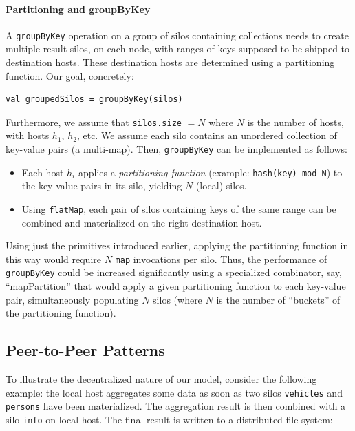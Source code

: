 \documentclass[preprint]{sigplanconf}
\theoremstyle{definition}
\theoremstyle{definition}
\begin{document}
\paragraph{Partitioning and groupByKey}

A \verb|groupByKey| operation on a group of silos containing collections needs
to create multiple result silos, on each node, with ranges of keys supposed to
be shipped to destination hosts. These destination hosts are determined using
a partitioning function. Our goal, concretely:

\begin{lstlisting}
val groupedSilos = groupByKey(silos)
\end{lstlisting}
\noindent
Furthermore, we assume that \verb|silos.size| $= N$ where $N$ is the number of
hosts, with hosts $h_1$, $h_2$, etc. We assume each silo contains an unordered
collection of key-value pairs (a multi-map). Then, \verb|groupByKey| can be
implemented as follows:

\begin{itemize}
\item Each host $h_i$ applies a {\em partitioning function}
(example: \texttt{hash(key) mod N}) to the key-value pairs in its silo,
yielding $N$ (local) silos.

\item Using \verb|flatMap|, each pair of silos containing keys of the
same range can be combined and materialized on the right destination host.
\end{itemize}

Using just the primitives introduced earlier, applying the partitioning
function in this way would require $N$ \verb|map| invocations per silo. Thus,
the performance of \verb|groupByKey| could be increased significantly using a
specialized combinator, say, ``mapPartition'' that would apply a given
partitioning function to each key-value pair, simultaneously populating $N$
silos (where $N$ is the number of ``buckets'' of the partitioning function).


\subsection{Peer-to-Peer Patterns}\label{sec:decentral}

To illustrate the decentralized nature of our model, consider the following
example: the local host aggregates some data as soon as two silos
\verb|vehicles| and \verb|persons| have been materialized. The aggregation
result is then combined with a silo \verb|info| on local host. The final
result is written to a distributed file system:
\end{document}
